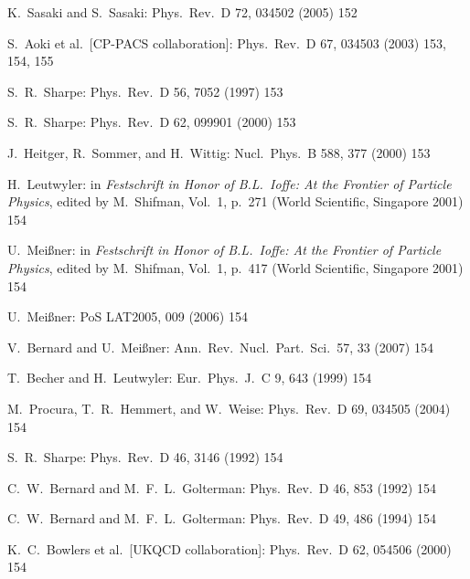 \begin{enumerate}[label={[\arabic*]}]
  \item K.~Sasaki and S.~Sasaki: Phys.\ Rev.\ D 72, 034502 (2005) 152
  \item S.~Aoki et al.\ [CP-PACS collaboration]: Phys.\ Rev.\ D 67, 034503
        (2003) 153, 154, 155
  \item S.~R.~Sharpe: Phys.\ Rev.\ D 56, 7052 (1997) 153
  \item S.~R.~Sharpe: Phys.\ Rev.\ D 62, 099901 (2000) 153
  \item J.~Heitger, R.~Sommer, and H.~Wittig: Nucl.\ Phys.\ B 588, 377 (2000)
        153
  \item H.~Leutwyler: in \emph{Festschrift in Honor of B.L.~Ioffe: At the
        Frontier of Particle Physics}, edited by M.~Shifman, Vol.~1, p.~271
        (World Scientific, Singapore 2001) 154
  \item U.~Mei\ss ner: in \emph{Festschrift in Honor of B.L.~Ioffe: At the
        Frontier of Particle Physics}, edited by M.~Shifman, Vol.~1, p.~417
        (World Scientific, Singapore 2001) 154
  \item U.~Mei\ss ner: PoS LAT2005, 009 (2006) 154
  \item V.~Bernard and U.~Mei\ss ner: Ann.\ Rev.\ Nucl.\ Part.\ Sci.\ 57, 33
        (2007) 154
  \item T.~Becher and H.~Leutwyler: Eur.\ Phys.\ J.\ C 9, 643 (1999) 154
  \item M.~Procura, T.~R.~Hemmert, and W.~Weise: Phys.\ Rev.\ D 69, 034505
        (2004) 154
  \item S.~R.~Sharpe: Phys.\ Rev.\ D 46, 3146 (1992) 154
  \item C.~W.~Bernard and M.~F.~L.~Golterman: Phys.\ Rev.\ D 46, 853 (1992) 154
  \item C.~W.~Bernard and M.~F.~L.~Golterman: Phys.\ Rev.\ D 49, 486 (1994) 154
  \item K.~C.~Bowlers et al.\ [UKQCD collaboration]: Phys.\ Rev.\ D 62, 054506
        (2000) 154
\end{enumerate}
